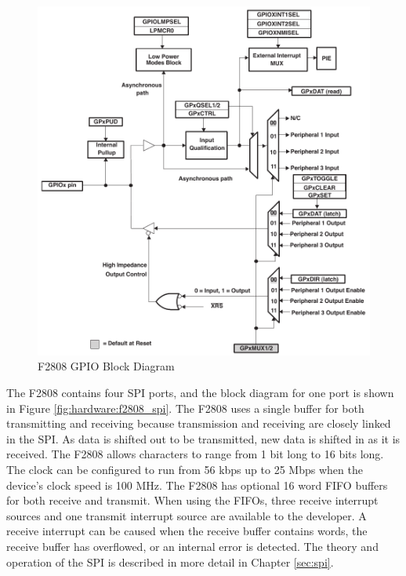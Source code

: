 \begin{figure}[ptb]
	\begin{centering}
		\includegraphics[scale=0.75]{Hardware/Figures/hardware-f2808_gpio.pdf}
		\caption[F2808 GPIO Block Diagram]{F2808 GPIO Block Diagram\cite{ref:2006-ti-f2808_system_control_and_interrupts}}
		\label{fig:hardware:f2808_gpio}
	\end{centering}
\end{figure}

The F2808 contains four SPI ports, and the block diagram for one port is shown in Figure \ref{fig:hardware:f2808_spi}. The F2808 uses a single buffer for both transmitting and receiving because transmission and receiving are closely linked in the SPI. As data is shifted out to be transmitted, new data is shifted in as it is received. The F2808 allows characters to range from 1 bit long to 16 bits long. The clock can be configured to run from 56 kbps up to 25 Mbps when the device's clock speed is 100 MHz. The F2808 has optional 16 word FIFO buffers for both receive and transmit. When using the FIFOs, three receive interrupt sources and one transmit interrupt source are available to the developer. A receive interrupt can be caused when the receive buffer contains  words, the receive buffer has overflowed, or an internal error is detected. \cite{ref:2006-ti-f2808_spi} The theory and operation of the SPI is described in more detail in Chapter \ref{sec:spi}. 

